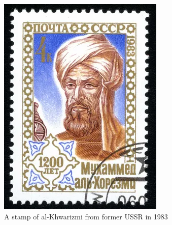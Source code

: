 \documentclass[b5paper]{article}
\begin{document}
\begin{figure}[htbp]
 \centering
 \includegraphics[scale=0.3]{img/Khwarizmi}
 \caption{A stamp of al-Khwarizmi from former USSR in 1983}
 \label{fig:kwarizmi}
\end{figure}
\end{document}
